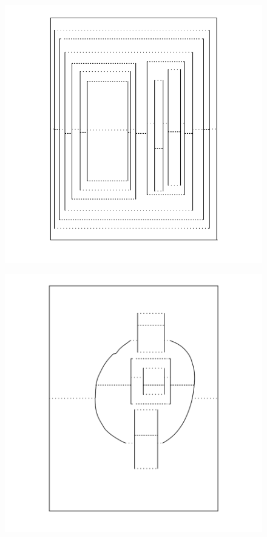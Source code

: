 \begin{figure}[htbp]
\centering
\includegraphics{figures/92_Appendix_Visual_Aids_Materials/lined_card4.png}
\caption{}
\end{figure}

\clearpage

\begin{figure}[htbp]
\centering
\includegraphics{figures/92_Appendix_Visual_Aids_Materials/lined_card5.png}
\caption{}
\end{figure}

